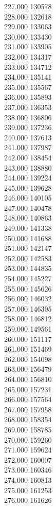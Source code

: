 { 227.000	130578 \\
 228.000	132618 \\
 229.000	133063 \\
 230.000	133430 \\
 231.000	133905 \\
 232.000	134317 \\
 233.000	134712 \\
 234.000	135141 \\
 235.000	135567 \\
 236.000	135893 \\
 237.000	136353 \\
 238.000	136806 \\
 239.000	137236 \\
 240.000	137613 \\
 241.000	137987 \\
 242.000	138454 \\
 243.000	138880 \\
 244.000	139224 \\
 245.000	139628 \\
 246.000	140105 \\
 247.000	140478 \\
 248.000	140863 \\
 249.000	141338 \\
 250.000	141688 \\
 251.000	142147 \\
 252.000	142583 \\
 253.000	144835 \\
 254.000	145227 \\
 255.000	145626 \\
 256.000	146032 \\
 257.000	146395 \\
 258.000	146812 \\
 259.000	149561 \\
 260.000	151117 \\
 261.000	151469 \\
 262.000	154098 \\
 263.000	156479 \\
 264.000	156810 \\
 265.000	157231 \\
 266.000	157564 \\
 267.000	157958 \\
 268.000	158354 \\
 269.000	158785 \\
 270.000	159260 \\
 271.000	159624 \\
 272.000	160007 \\
 273.000	160346 \\
 274.000	160813 \\
 275.000	161253 \\
 276.000	161626 \\
}

